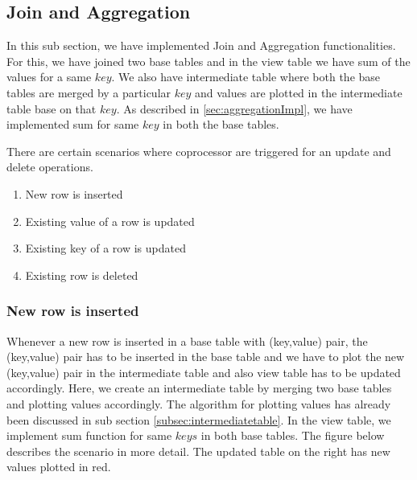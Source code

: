 \documentclass[11pt,a4paper,bibtotoc,idxtotoc,headsepline,footsepline,footexclude,BCOR12mm,DIV13]{scrbook}
\begin{document}
\newpage
\subsection{Join and Aggregation}
In this sub section, we have implemented Join and Aggregation functionalities. For this, we have joined two base tables and in the view table we have sum of the values for a same $key$. We also have intermediate table where both the base tables are merged by a particular $key$ and values are plotted in the intermediate table base on that $key$. As described in \ref{sec:aggregationImpl}, we have implemented sum for same $key$ in both the base tables. 


	

There are certain scenarios where coprocessor are triggered for an update and delete operations.

\begin{enumerate}
	\item New row is inserted
	\item Existing value of a row is updated
	\item Existing key of a row is updated
	\item Existing row is deleted
\end{enumerate}

\subsubsection{New row is inserted}
Whenever a new row is inserted in a base table with (key,value) pair, the (key,value) pair has to be inserted in the base table and we have to plot the new (key,value) pair in the intermediate table and also view table has to be updated accordingly. Here, we create an intermediate table by merging two base tables and plotting values accordingly. The algorithm for plotting values has already been discussed in sub section \ref{subsec:intermediatetable}. In the view table, we implement sum function for same $keys$ in both base tables.
The figure below describes the scenario in more detail. The updated table on the right has new values plotted in red.
\end{document}
